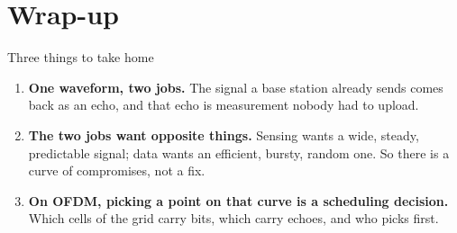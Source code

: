 
\section[Wrap-up]{Wrap-up}


\begin{frame}{Three things to take home}
  \vspace{0.6em}
  \begin{enumerate}\itemsep14pt
    \item \textbf{One waveform, two jobs.} The signal a base station already sends
      comes back as an echo, and that echo is measurement nobody had to upload.
    \item \textbf{The two jobs want opposite things.} Sensing wants a wide, steady,
      predictable signal; data wants an efficient, bursty, random one. So there is a
      curve of compromises, not a fix.
    \item \textbf{On OFDM, picking a point on that curve is a scheduling decision.}
      Which cells of the grid carry bits, which carry echoes, and who picks first.
  \end{enumerate}

  \vspace{0.9em}
\end{frame}

